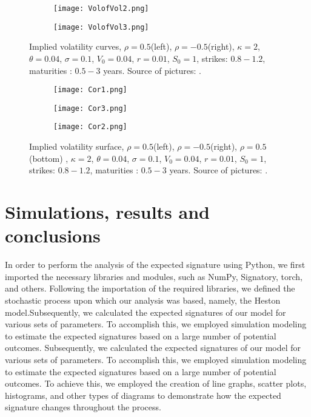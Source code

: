 \documentclass[12pt,a4paper]{report}
\theoremstyle{definition}
\begin{document}
\begin{figure}[!htbp]
	\centering
	\begin{subfigure}{0.5\textwidth}
		\centering
		\texttt{[image: VolofVol2.png]}
		\caption{}
		\label{fig:sub1}
	\end{subfigure}%
	\begin{subfigure}{0.5\textwidth}
		\centering
		\texttt{[image: VolofVol3.png]}
		\caption{}
		\label{fig:sub2}
	\end{subfigure}
	\caption{Implied volatility curves, $\rho = 0.5$(left), $\rho = -0.5$(right), $\kappa = 2$,
		$\theta = 0.04$, $\sigma = 0.1$, $V_0 = 0.04$, $r = 0.01$, $S_0 =1$, strikes: $0.8 - 1.2$, maturities : $0.5 - 3$ years. Source of pictures: \parencite{moodley2005heston}.}
	\label{Fig3.8}
\end{figure}

\begin{figure}[!htbp]
	\centering
	\begin{subfigure}{0.5\textwidth}
		\centering
		\texttt{[image: Cor1.png]}
		\caption{}
		\label{fig:sub1}
	\end{subfigure}%
	\begin{subfigure}{0.5\textwidth}
		\centering
		\texttt{[image: Cor3.png]}
		\caption{}
		\label{fig:sub2}
	\end{subfigure}
	\begin{subfigure}{0.5\textwidth}
	\centering
	\texttt{[image: Cor2.png]}
	\caption{}
	\label{fig:sub3}
	\end{subfigure}%
	\caption{Implied volatility surface, $\rho = 0.5$(left), $\rho = -0.5$(right), $\rho = 0.5$(bottom) , $\kappa = 2$,
		$\theta = 0.04$, $\sigma = 0.1$, $V_0 = 0.04$, $r = 0.01$, $S_0 =1$, strikes: $0.8 - 1.2$, maturities : $0.5 - 3$ years. Source of pictures: \parencite{moodley2005heston}.}
	\label{Fig3.5}
\end{figure}





\section{Simulations, results and conclusions}

In order to perform the analysis of the expected signature using Python, we first imported the necessary libraries and modules, such as NumPy, Signatory, torch, and others. Following the importation of the required libraries, we defined the stochastic process upon which our analysis was based, namely, the Heston model.Subsequently, we calculated the expected signatures of our model for various sets of parameters. To accomplish this, we employed simulation modeling to estimate the expected signatures based on a large number of potential outcomes. Subsequently, we calculated the expected signatures of our model for various sets of parameters. To accomplish this, we employed simulation modeling to estimate the expected signatures based on a large number of potential outcomes. To achieve this, we employed the creation of line graphs, scatter plots, histograms, and other types of diagrams to demonstrate how the expected signature changes throughout the process.
\end{document}
